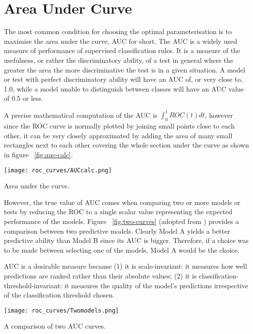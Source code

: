 \section{Area Under Curve} 
The most common condition for choosing the optimal parameterisation is to maximise the area under the curve, AUC for short. The AUC is a widely used measure of performance of supervised classification rules. It is a measure of the usefulness, or rather the discriminatory ability, of a test in general where the greater the area the more discriminative the test is in a given situation. A model or test with perfect discriminatory ability will have an AUC of, or very close to, 1.0, while a model unable to distinguish between classes will have an AUC value of 0.5 or less.

A precise mathematical computation of the AUC is $\int_{0}^{1} ROC(t) dt$, however since the ROC curve is normally plotted by joining small points close to each other, it can be very closely approximated by adding the area of many small rectangles next to each other covering the whole section under the curve as shown in figure ~\ref{fig:auc-calc}.

\begin{marginfigure}
	\texttt{[image: roc\_curves/AUCcalc.png]}
	\caption{Area under the curve.}
	\label{fig:auc-calc}
\end{marginfigure}

However, the true value of AUC comes when comparing two or more models or tests by reducing the ROC to a single scalar value representing the expected performance of the models. Figure ~\ref{fig:two-curves} (adopted from \citet{linden2006diagpreddismgmt}) provides a comparison between two predictive models. Clearly Model A yields a better predictive ability than Model B since its AUC is bigger. Therefore, if a choice was to be made between selecting one of the models, Model A would be the choice.

AUC is a desirable measure because (1) it is scale-invariant: it measures how well predictions are ranked rather than their absolute values; (2) it is classification-threshold-invariant: it measures the quality of the model’s predictions irrespective of the classification threshold chosen.

\begin{marginfigure}
	\texttt{[image: roc\_curves/Twomodels.png]}
	\caption{A comparison of two AUC curves.}
	\label{fig:two-curves}
\end{marginfigure}

